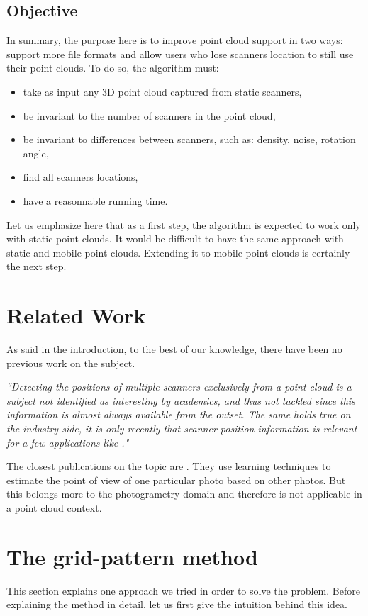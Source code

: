\subsection{Objective}
In summary, the purpose here is to improve \CC point cloud support in two ways: support more file formats and allow users who lose scanners location to still use their point clouds. To do so, the algorithm must:
\begin{itemize}
\item take as input any 3D point cloud captured from static scanners,
\item be invariant to the number of scanners in the point cloud,
\item be invariant to differences between scanners, such as: density, noise, rotation angle,
\item find all scanners locations,
\item have a reasonnable running time.
\end{itemize}

Let us emphasize here that as a first step, the algorithm is expected to work only with static point clouds. It would be difficult to have the same approach with static and mobile point clouds. Extending it to mobile point clouds is certainly the next step.

\section{Related Work}
\label{sc:work}
As said in the introduction, to the best of our knowledge, there have been no previous work on the subject.

\emph{``Detecting the positions of multiple scanners exclusively from a point cloud is a subject not identified as interesting by academics, and thus not tackled since this information is almost always available from the outset. The same holds true on the industry side, it is only recently that scanner position information is relevant for a few applications like \CC."}

The closest publications on the topic are \cite{ml1, ml2, ml3, ml4, ml5}. They use learning techniques to estimate the point of view of one particular photo based on other photos. But this belongs more to the photogrametry domain and therefore is not applicable in a point cloud context.


\section{The grid-pattern method}
\label{sc:grid-pattern}
This section explains one approach we tried in order to solve the problem. Before explaining the method in detail, let us first give the intuition behind this idea.

